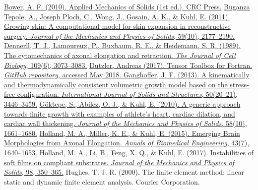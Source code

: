 \documentclass[10pt,letterpaper,oneside]{report}
\begin{document}
\begin{thebibliography}{99}
\href{http://solidmechanics.org/}{%
Bower, A. F. (2010). Applied Mechanics of Solids (1st ed.). CRC Press.}
%
\href{http://doi.org/10.1016/j.jmps.2011.05.004}{%
Buganza Tepole, A., Joseph Ploch, C., Wong, J., Gosain, A. K., \& Kuhl, E. (2011). Growing skin: A computational model for skin expansion in reconstructive surgery. \textit{Journal of the Mechanics and Physics of Solids}, 59(10), 2177–2190.}
%
\href{http://jcb.rupress.org/content/109/6/3073.abst}{%
Dennerll, T. J., Lamoureux, P., Buxbaum, R. E., \& Heidemann, S. R. (1989). The cytomechanics of axonal elongation and retraction. \textit{The Journal of Cell Biology}, 109(6), 3073–3083.}
%
\href{https://adtzlr.github.io/TensorToolbox/}{%
Dutzler, Andreas (2017). Tensor Toolbox for Fortran. \textit{GitHub repository}, accessed May 2018. }
%
\href{http://doi.org/10.1016/j.ijsolstr.2013.06.011}{%
Ganghoffer, J. F. (2013). A kinematically and thermodynamically consistent volumetric growth model based on the stress-free configuration. \textit{International Journal of Solids and Structures}, 50(20–21), 3446–3459.}
%
\href{http://doi.org/10.1016/j.jmps.2010.07.003}{%
Göktepe, S., Abilez, O. J., \& Kuhl, E. (2010). A generic approach towards finite growth with examples of athlete’s heart, cardiac dilation, and cardiac wall thickening. \textit{Journal of the Mechanics and Physics of Solids}, 58(10), 1661–1680.}
%
\href{http://doi.org/10.1007/s10439-015-1312-9}{%
Holland, M. A., Miller, K. E., \& Kuhl, E. (2015). Emerging Brain Morphologies from Axonal Elongation. \textit{Annals of Biomedical Engineering}, 43(7), 1640–1653.}
% 
\href{http://doi.org/10.1016/j.jmps.2016.09.012}{%
Holland, M. A., Li, B., Feng, X. Q., \& Kuhl, E. (2017). Instabilities of soft films on compliant substrates. \textit{Journal of the Mechanics and Physics of Solids}, 98, 350–365.}
%
Hughes, T. J. R. (2000). The finite element method: linear static and dynamic finite element analysis. Courier Corporation.

\end{thebibliography}
\end{document}
